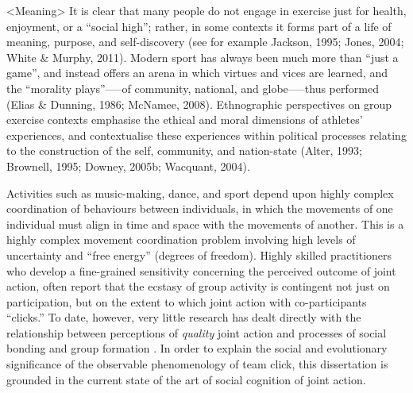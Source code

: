 <Meaning>
It is clear that many people do not engage in exercise just for health, enjoyment, or a ``social high''; rather, in some contexts it forms part of a life of meaning, purpose, and self-discovery (see for example Jackson, 1995; Jones, 2004; White \& Murphy, 2011). Modern sport has always been much more than ``just a game'', and instead offers an arena in which virtues and vices are learned, and the ``morality plays''—--of community, national, and globe—--thus performed (Elias \& Dunning, 1986; McNamee, 2008).  Ethnographic perspectives on group exercise contexts emphasise the ethical and moral dimensions of athletes’ experiences, and contextualise these experiences within political processes relating to the construction of the self, community, and nation-state (Alter, 1993; Brownell, 1995; Downey, 2005b; Wacquant, 2004).

Activities such as music-making, dance, and sport depend upon highly complex coordination of behaviours between individuals, in which the movements of one individual must align in time and space with the movements of another. This is a highly complex movement coordination problem involving high levels of uncertainty and ``free energy'' (degrees of freedom). Highly skilled practitioners who develop a fine-grained sensitivity concerning the perceived outcome of joint action, often report that the ecstasy of group activity is contingent not just on participation, but on the extent to which joint action with co-participants ``clicks.'' To date, however, very little research has dealt directly with the relationship between perceptions of \textit{quality} joint action and processes of social bonding and group formation \citep[but see][]{Marsh2009}.
In order to explain the social and evolutionary significance of the observable phenomenology of team click, this dissertation is grounded in the current state of the art of social cognition of joint action.

